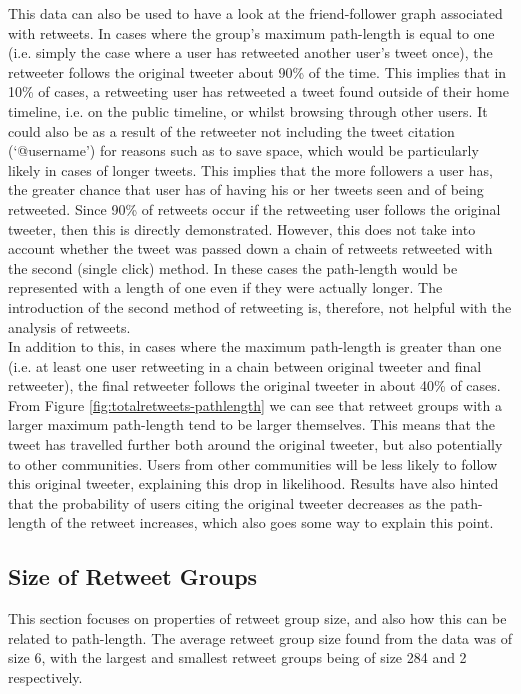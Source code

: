 This data can also be used to have a look at the friend-follower graph associated with retweets. In cases where the group's maximum path-length is equal to one (i.e. simply the case where a user has retweeted another user's tweet once), the retweeter follows the original tweeter about 90\% of the time. This implies that in 10\% of cases, a retweeting user has retweeted a tweet found outside of their home timeline, i.e. on the public timeline, or whilst browsing through other users. It could also be as a result of the retweeter not including the tweet citation (`@username') for reasons such as to save space, which would be particularly likely in cases of longer tweets. This implies that the more followers a user has, the greater chance that user has of having his or her tweets seen and of being retweeted. Since 90\% of retweets occur if the retweeting user follows the original tweeter, then this is directly demonstrated. However, this does not take into account whether the tweet was passed down a chain of retweets retweeted with the second (single click) method. In these cases the path-length would be represented with a length of one even if they were actually longer. The introduction of the second method of retweeting is, therefore, not helpful with the analysis of retweets.\\
In addition to this, in cases where the maximum path-length is greater than one (i.e. at least one user retweeting in a chain between original tweeter and final retweeter), the final retweeter follows the original tweeter in about 40\% of cases. From Figure \ref{fig:totalretweets-pathlength} we can see that retweet groups with a larger maximum path-length tend to be larger themselves. This means that the tweet has travelled further both around the original tweeter, but also potentially to other communities. Users from other communities will be less likely to follow this original tweeter, explaining this drop in likelihood. Results have also hinted that the probability of users citing the original tweeter decreases as the path-length of the retweet increases, which also goes some way to explain this point. 

\subsection{Size of Retweet Groups}
\label{size of retweet groups}
This section focuses on properties of retweet group size, and also how this can be related to path-length. The average retweet group size found from the data was of size 6, with the largest and smallest retweet groups being of size 284 and 2 respectively.\\

